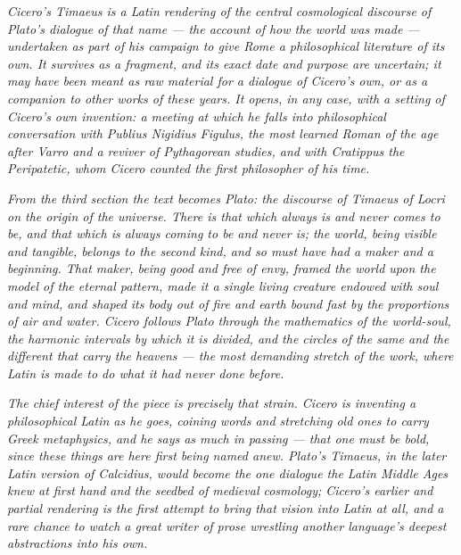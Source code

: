 
\textit{Cicero's \textit{Timaeus} is a Latin rendering of the central
cosmological discourse of Plato's dialogue of that name --- the account
of how the world was made --- undertaken as part of his campaign to give
Rome a philosophical literature of its own. It survives as a fragment,
and its exact date and purpose are uncertain; it may have been meant as
raw material for a dialogue of Cicero's own, or as a companion to other
works of these years. It opens, in any case, with a setting of Cicero's
own invention: a meeting at which he falls into philosophical
conversation with Publius Nigidius Figulus, the most learned Roman of the
age after Varro and a reviver of Pythagorean studies, and with Cratippus
the Peripatetic, whom Cicero counted the first philosopher of his time.}

\textit{From the third section the text becomes Plato: the discourse of
Timaeus of Locri on the origin of the universe. There is that which
always is and never comes to be, and that which is always coming to be
and never is; the world, being visible and tangible, belongs to the
second kind, and so must have had a maker and a beginning. That maker,
being good and free of envy, framed the world upon the model of the
eternal pattern, made it a single living creature endowed with soul and
mind, and shaped its body out of fire and earth bound fast by the
proportions of air and water. Cicero follows Plato through the
mathematics of the world-soul, the harmonic intervals by which it is
divided, and the circles of the same and the different that carry the
heavens --- the most demanding stretch of the work, where Latin is made
to do what it had never done before.}

\textit{The chief interest of the piece is precisely that strain. Cicero
is inventing a philosophical Latin as he goes, coining words and
stretching old ones to carry Greek metaphysics, and he says as much in
passing --- that one must be bold, since these things are here first
being named anew. Plato's \textit{Timaeus}, in the later Latin version of
Calcidius, would become the one dialogue the Latin Middle Ages knew at
first hand and the seedbed of medieval cosmology; Cicero's earlier and
partial rendering is the first attempt to bring that vision into Latin at
all, and a rare chance to watch a great writer of prose wrestling another
language's deepest abstractions into his own.}
